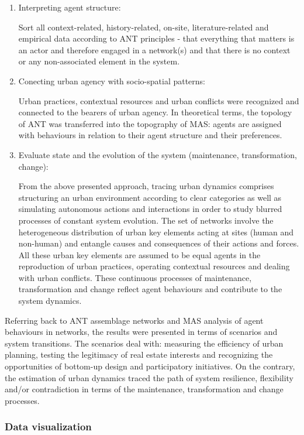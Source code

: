 \documentclass[11pt]{report}
\begin{document}
\begin{enumerate}
\item Interpreting agent structure:

Sort all context-related, history-related, on-site, literature-related and empirical data according to ANT principles - that everything that matters is an actor and therefore engaged in a network(s) and that there is no context or any non-associated element in the system. 

\item Conecting urban agency with socio-spatial patterns:

Urban practices, contextual resources and urban conflicts were recognized and connected to the bearers of urban agency.
In theoretical terms, the topology of ANT was transferred into the topography of MAS: agents are assigned with behaviours in relation to their agent structure and their preferences.

\item Evaluate state and the evolution of the system (maintenance, transformation, change):

From the above presented approach, tracing urban dynamics comprises structuring an urban environment according to clear categories as well as simulating autonomous actions and interactions in order to study blurred processes of constant system evolution.
The set of networks involve the heterogeneous distribution of urban key elements acting at sites (human and non-human) and entangle causes and consequences of their actions and forces.
All these urban key elements are assumed to be equal agents in the reproduction of urban practices, operating contextual resources and dealing with urban conflicts. These continuous processes of maintenance, transformation and change reflect agent behaviours and contribute to the system dynamics.
\end{enumerate}

Referring back to ANT assemblage networks and MAS analysis of agent behaviours in networks, the results were presented in terms of scenarios and system transitions. The scenarios deal with: measuring the efficiency of urban planning, testing the legitimacy of real estate interests and recognizing the opportunities of bottom-up design and participatory initiatives. On the contrary, the estimation of urban dynamics traced the path of system resilience, flexibility and/or contradiction in terms of the maintenance, transformation and change processes.

\subsubsection{Data visualization}
\end{document}
